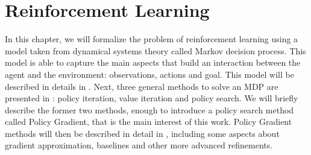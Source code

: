 \chapter{Reinforcement Learning}
\label{ch:rl}

In this chapter, we will formalize the problem of reinforcement learning using a model taken from dynamical systems theory called Markov decision process. This model is able to capture the main aspects that build an interaction between the agent and the environment: observations, actions and goal. This model will be described in details in . Next, three general methods to solve an MDP are presented in : policy iteration, value iteration and policy search. We will briefly describe the former two methods, enough to introduce a policy search method called Policy Gradient, that is the main interest of this work. Policy Gradient methods will then be described in detail in , including some aspects about gradient approximation, baselines and other more advanced refinements.








